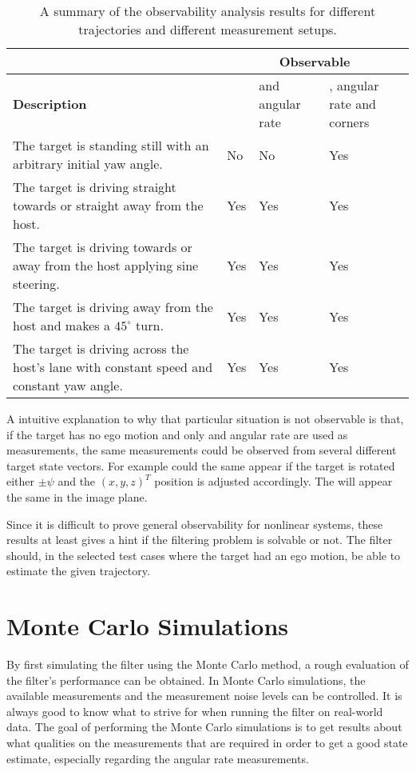 \begin{table}[!ht]
	\centering
	\caption{\label{tab:observabilityresult} A summary of the observability analysis results for different trajectories and different measurement setups.}
	\begin{tabular}{|p{5cm}|p{1cm}|p{2cm}|p{2.5cm}|}
		\cline{2-4}
		\multicolumn{1}{c|}{} & \multicolumn{3}{c|}{\textbf{Observable}} \\
		\hline
		\textbf{Description} & \abbrROI & \abbrROI and angular rate & \abbrROI, angular rate and corners \\
		\hline
		The target is standing still with an arbitrary initial yaw angle. & No & No & Yes \\
		\hline
		The target is driving straight towards or straight away from the host. & Yes & Yes & Yes \\
		\hline
		The target is driving towards or away from the host applying sine steering. & Yes & Yes & Yes \\
		\hline
		The target is driving away from the host and makes a $45^\circ$ turn. & Yes & Yes & Yes \\
		\hline
		The target is driving across the host's lane with constant speed and constant yaw angle. & Yes & Yes & Yes \\
		\hline
	\end{tabular}
\end{table}

A intuitive explanation to why that particular situation is not observable is that, if the target has no ego motion and only \abbrROI and angular rate are used as measurements, the same \abbrROI measurements could be observed from several different target state vectors.
For example could the same \abbrROI appear if the target is rotated either $\pm\psi$ and the $(x,y,z)^T$ position is adjusted accordingly.
The \abbrROI will appear the same in the image plane.

Since it is difficult to prove general observability for nonlinear systems, these results at least gives a hint if the filtering problem is solvable or not.
The filter should, in the selected test cases where the target had an ego motion, be able to estimate the given trajectory.

\newpage

\section{Monte Carlo Simulations}
\label{sec:montecarloresult}
By first simulating the filter using the Monte Carlo method, a rough evaluation of the filter's performance can be obtained.
In Monte Carlo simulations, the available measurements and the measurement noise levels can be controlled.
It is always good to know what to strive for when running the filter on real-world data.
The goal of performing the Monte Carlo simulations is to get results about what qualities on the measurements that are required in order to get a good state estimate, especially regarding the angular rate measurements.

